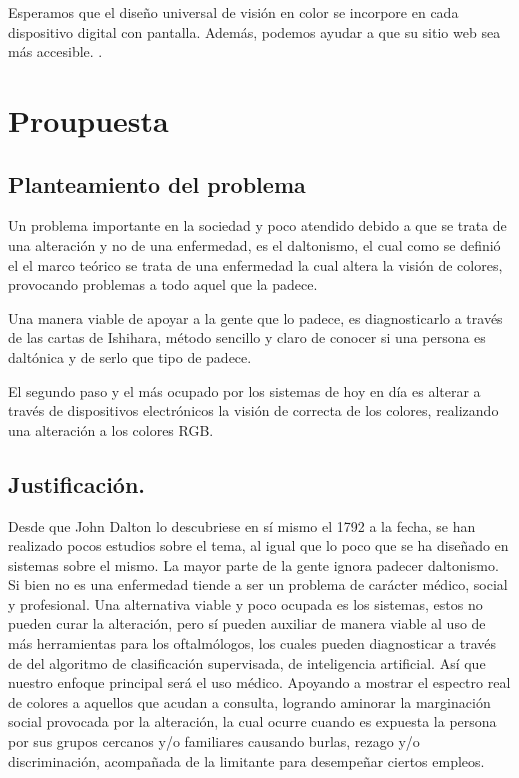 \documentclass[10pt]{article}
\begin{document}
\setlength{\parskip}{2mm}

Esperamos que el diseño universal de visión en color se incorpore en cada dispositivo digital con pantalla. Además, podemos ayudar a que su sitio web sea más accesible.
\cite{IEEEreferencias:Ref3}.

\section{Proupuesta}

\subsection{Planteamiento del problema}

Un problema importante en la sociedad y poco atendido debido a que se trata de una alteración y no de una enfermedad, es el daltonismo, el cual como se definió el el marco teórico se trata de una enfermedad la cual altera la visión de colores, provocando problemas a todo aquel que la padece.

\setlength{\parskip}{2mm}

Una manera viable de apoyar a la gente que lo padece, es diagnosticarlo a través de las cartas de Ishihara, método sencillo y claro de conocer si una persona es daltónica y de serlo que tipo de padece.

\setlength{\parskip}{2mm}

El segundo paso y el más ocupado por los sistemas de hoy en día es alterar a través de dispositivos electrónicos la visión de correcta de los colores, realizando una alteración a los colores RGB.

\subsection{Justificación.}

Desde que John Dalton lo descubriese en sí mismo el 1792 \cite{IEEEreferencias:Ref1} a la fecha, se han realizado pocos estudios sobre el tema, al igual que lo poco que se ha diseñado en sistemas sobre el mismo. La mayor parte de la gente ignora padecer daltonismo. Si bien no es una enfermedad tiende a ser un problema de carácter médico, social y profesional. Una alternativa viable y poco ocupada es los sistemas, estos no pueden curar la alteración, pero sí pueden auxiliar de manera viable al uso de más herramientas para los oftalmólogos, los cuales pueden diagnosticar a través de del algoritmo de clasificación supervisada, de inteligencia artificial. Así que nuestro enfoque principal será el uso médico. Apoyando a mostrar el espectro real de colores a aquellos que acudan a consulta, logrando aminorar la marginación social provocada por la alteración, la cual ocurre cuando es expuesta la persona por sus grupos cercanos y/o familiares causando burlas, rezago y/o discriminación, acompañada de la limitante para desempeñar ciertos empleos.
\end{document}
